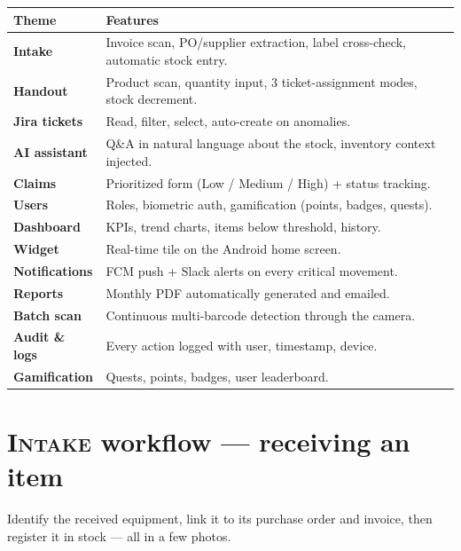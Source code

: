 \documentclass[11pt,a4paper]{article}
\begin{document}
\begin{center}
\begin{tabularx}{\linewidth}{@{}lX@{}}
\toprule
\textbf{Theme} & \textbf{Features}\\
\midrule
\textbf{Intake}          & Invoice scan, PO/supplier extraction, label cross-check, automatic stock entry.\\
\textbf{Handout}         & Product scan, quantity input, 3 ticket-assignment modes, stock decrement.\\
\textbf{Jira tickets}    & Read, filter, select, auto-create on anomalies.\\
\textbf{AI assistant}    & Q\&A in natural language about the stock, inventory context injected.\\
\textbf{Claims}          & Prioritized form (Low / Medium / High) + status tracking.\\
\textbf{Users}           & Roles, biometric auth, gamification (points, badges, quests).\\
\textbf{Dashboard}       & KPIs, trend charts, items below threshold, history.\\
\textbf{Widget}          & Real-time tile on the Android home screen.\\
\textbf{Notifications}   & FCM push + Slack alerts on every critical movement.\\
\textbf{Reports}         & Monthly PDF automatically generated and emailed.\\
\textbf{Batch scan}      & Continuous multi-barcode detection through the camera.\\
\textbf{Audit \& logs}   & Every action logged with user, timestamp, device.\\
\textbf{Gamification}    & Quests, points, badges, user leaderboard.\\
\bottomrule
\end{tabularx}
\end{center}

\section{\textsc{Intake} workflow — receiving an item}

\begin{infobox}[Goal]
Identify the received equipment, link it to its purchase order and
invoice, then register it in stock — all in a few photos.
\end{infobox}
\end{document}
